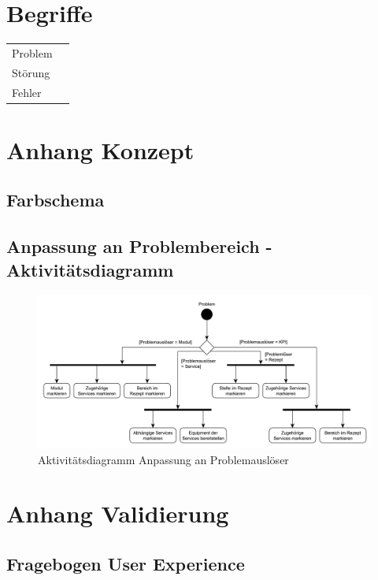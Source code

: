 \chapter{Begriffe}

\begin{table}[htbp]
\begin{tabular}{ll}
Problem & \\
Störung & \\
Fehler & \\
\end{tabular}
\end{table}

\chapter{Anhang Konzept}
\section{Farbschema}

\section{Anpassung an Problembereich - Aktivitätsdiagramm}

\begin{figure}[htbp]
\centering
\includegraphics[angle=90,scale=0.6]{DA_files/UML/Anhang/Aktivitaetsdiagramm-Problem.pdf}
\caption{Aktivitätsdiagramm Anpassung an Problemauslöser}
\end{figure}

\chapter{Anhang Validierung}
\section{Fragebogen User Experience}

